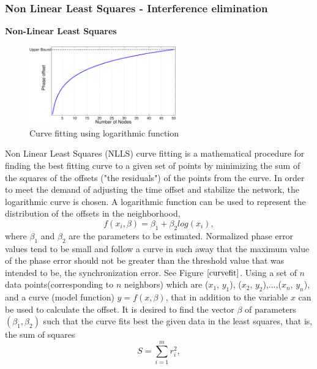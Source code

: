 \documentclass[journal]{IEEEtran}
\begin{document}
\subsubsection{\textbf{Non Linear Least Squares - Interference
elimination}} 
\textbf{Non-Linear Least Squares} \newline 
\begin{figure}[b]
\centering
\includegraphics[width=2.5in]{curvefit}
\caption{Curve fitting using logarithmic function} \label{curvefit}
\end{figure} 
Non Linear Least Squares (NLLS) curve fitting  is a mathematical procedure for
finding the best fitting curve to a given set of points by
minimizing the sum of the squares of the offsets ("the residuals")
of the points from the curve. \newline 
In order to meet the demand of adjusting the time offset and stabilize the network, the logarithmic curve is chosen. A logarithmic function can be used to represent
the distribution of the offsets in the neighborhood,
\begin{equation}
 f(x_i,\beta)= \beta _1 + \beta_2log(x_i),
\end{equation}
where $\beta_1$ and $\beta_2$ are the parameters to be estimated.\newline
Normalized phase error values tend to be small and follow a curve in such away that the maximum value of the phase error should not be greater than the threshold value that was intended to be, the synchronization error. See Figure $\ref{curvefit}$.
\newline 
Using a set of $n$ data points(corresponding to $n$ neighbors) which are ($x_1$, $y_1$),
($x_2$, $y_2$),$\dots$,($x_n$, $y_n$), and a curve (model function)
$y= f(x, \beta)$, that in addition to the variable $x$ can be used to calculate the offset.
\newline 
It is desired to find the vector $\beta$ of parameters $(\beta_1, \beta_2)$ such that the curve fits best the given data in the least squares, that is, the sum of squares 
\begin{equation}
    S=\sum_{i=1}^{m}r_i^2 ,
\end{equation}
\end{document}
